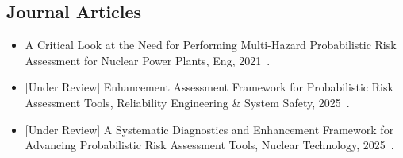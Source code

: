 \subsection{Journal Articles}
\begin{itemize}
    \item {A Critical Look at the Need for Performing Multi-Hazard Probabilistic Risk Assessment for Nuclear Power Plants, Eng, 2021~\cite{aras_critical_2021}.}
    \item {[Under Review] Enhancement Assessment Framework for Probabilistic Risk Assessment Tools, Reliability Engineering \& System Safety, 2025~\cite{aras_nt_2025}.}
    \item {[Under Review] A Systematic Diagnostics and Enhancement Framework for Advancing Probabilistic Risk Assessment Tools, Nuclear Technology, 2025~\cite{aras_jress_2025}.}
\end{itemize}
